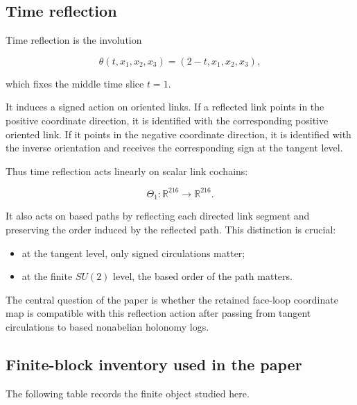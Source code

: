 \documentclass[10pt]{article}
\begin{document}
\subsection{Time reflection}

Time reflection is the involution

\[
\theta(t,x_1,x_2,x_3)=(2-t,x_1,x_2,x_3),
\]

which fixes the middle time slice \(t=1\).

It induces a signed action on oriented links.  If a reflected link points in the positive coordinate direction, it is identified with the corresponding positive oriented link.  If it points in the negative coordinate direction, it is identified with the inverse orientation and receives the corresponding sign at the tangent level.

Thus time reflection acts linearly on scalar link cochains:

\[
\Theta_1:\mathbb R^{216}\longrightarrow\mathbb R^{216}.
\]

It also acts on based paths by reflecting each directed link segment and preserving the order induced by the reflected path.  This distinction is crucial:

\begin{itemize}[leftmargin=*]
\item at the tangent level, only signed circulations matter;
\item at the finite \(SU(2)\) level, the based order of the path matters.
\end{itemize}

The central question of the paper is whether the retained face-loop coordinate map is compatible with this reflection action after passing from tangent circulations to based nonabelian holonomy logs.

\subsection{Finite-block inventory used in the paper}

The following table records the finite object studied here.
\end{document}
